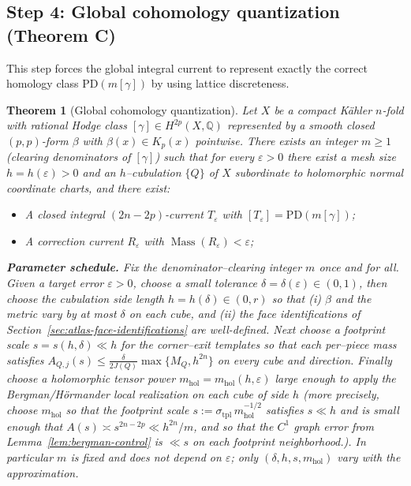 \documentclass[11pt]{article}
\numberwithin{equation}{section}  %
\theoremstyle{plain}
\newtheorem{theorem}{Theorem}[section]
\theoremstyle{definition}
\theoremstyle{remark}
\newcommand{\Q}{\mathbb{Q}}
\newcommand{\mhol}{m_{\mathrm{hol}}} %
\DeclareMathOperator{\Mass}{Mass}
\begin{document}
\subsection*{Step 4: Global cohomology quantization (Theorem C)}

This step forces the global integral current to represent exactly the
correct homology class $\mathrm{PD}(m[\gamma])$ by using lattice
discreteness.

\begin{theorem}[Global cohomology quantization]\label{thm:global-cohom}
Let $X$ be a compact K\"ahler $n$-fold with rational Hodge class
$[\gamma]\in H^{2p}(X,\Q)$ represented by a smooth closed $(p,p)$-form
$\beta$ with $\beta(x)\in K_p(x)$ pointwise.  {There exists an integer $m\ge 1$ (clearing denominators of $[\gamma]$) such that for every $\varepsilon>0$
there exist a mesh size $h=h(\varepsilon)>0$ and an $h$--cubulation $\{Q\}$ of $X$ subordinate to holomorphic normal coordinate charts, and there exist:}
\begin{itemize}
\item A closed integral $(2n-2p)$-current $T_\varepsilon$ with
$[T_\varepsilon]=\mathrm{PD}(m[\gamma])$;
\item A correction current $R_\varepsilon$ with $\Mass(R_\varepsilon)<\varepsilon$;
\end{itemize}
{\noindent\textbf{Parameter schedule.} Fix the denominator--clearing integer $m$ once and for all. Given a target error $\varepsilon>0$, choose a small tolerance $\delta=\delta(\varepsilon)\in(0,1)$, then choose the cubulation side length $h=h(\delta)\in(0,r)$ so that (i) $\beta$ and the metric vary by at most $\delta$ on each cube, and (ii) the face identifications of Section~\ref{sec:atlas-face-identifications} are well-defined. Next choose a footprint scale $s=s(h,\delta)\ll h$ for the corner--exit templates so that each per--piece mass satisfies $A_{Q,j}(s)\le \frac{\delta}{2J(Q)}\max\{M_Q,h^{2n}\}$ on every cube and direction. Finally choose a holomorphic tensor power $\mhol=\mhol(h,\varepsilon)$ large enough to apply the Bergman/H\"ormander local realization on each cube of side $h$ (more precisely, choose $\mhol$ so that the footprint scale $s:=\sigma_{\mathrm{tpl}}\,\mhol^{-1/2}$ satisfies $s\ll h$ and is small enough that $A(s)\asymp s^{2n-2p}\ll h^{2n}/m$, and so that the $C^1$ graph error from Lemma~\ref{lem:bergman-control} is $\ll s$ on each footprint neighborhood.). In particular $m$ is fixed and does not depend on $\varepsilon$; only $(\delta,h,s,\mhol)$ vary with the approximation.}


\end{theorem}
\end{document}
